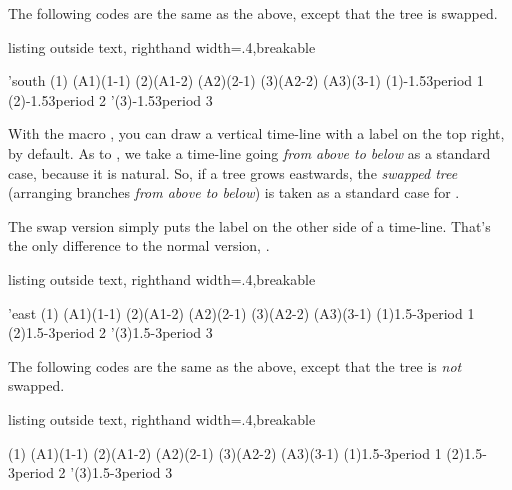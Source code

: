 The following codes are the same as the above, except that the tree is swapped.

\begin{tcblisting}{listing outside text, righthand width=.4\linewidth,breakable}
\begin{istgame}[font=\scriptsize]
\setistgrowdirection'{south} %
\xtdistance{10mm}{20mm}
\istrootcntm(1)       \istb \istbm \endist
\istroot(A1)(1-1)     \istb \istb  \endist
\istrootcntm(2)(A1-2) \istb \istbm \endist
\istroot(A2)(2-1)     \istb \istb  \endist
\istrootcntm(3)(A2-2) \istb \istbm \endist
\istroot(A3)(3-1)     \istb \istb  \endist
\xtTimeLineH[->](1){-1.5}{3}{period 1}
\xtTimeLineH(2){-1.5}{3}{period 2}
\xtTimeLineH'(3){-1.5}{3}{period 3}
\end{istgame}
\end{tcblisting}

With the macro \icmd{\xtTimeLineV}, you can draw a vertical time-line with a label on the top right, by default.
As to \cmd{\xtTimeLineV}, we take a time-line going \emph{from above to below} as a standard case, because it is natural.
So, if a tree grows eastwards, the \emph{swapped tree} (arranging branches \emph{from above to below}) is taken as a standard case for \cmd{\xtTimeLineV}.

The swap version  simply puts the label on the other side of a time-line.
That's the only difference to the normal version, \cmd{\xtTimeLineV}.

\begin{tcblisting}{listing outside text, righthand width=.4\linewidth,breakable}
\begin{istgame}[font=\scriptsize]
\setistgrowdirection'{east} %
\xtdistance{10mm}{20mm}
\istrootcntm(1)       \istb \istbm \endist
\istroot(A1)(1-1)     \istb \istb  \endist
\istrootcntm(2)(A1-2) \istb \istbm \endist
\istroot(A2)(2-1)     \istb \istb  \endist
\istrootcntm(3)(A2-2) \istb \istbm \endist
\istroot(A3)(3-1)     \istb \istb  \endist
\xtTimeLineV[->](1){1.5}{-3}{period 1}
\xtTimeLineV(2){1.5}{-3}{period 2}
\xtTimeLineV'(3){1.5}{-3}{period 3}
\end{istgame}
\end{tcblisting}

The following codes are the same as the above, except that the tree is \emph{not} swapped.
\begin{tcblisting}{listing outside text, righthand width=.4\linewidth,breakable}
\begin{istgame}[font=\scriptsize]
\xtdistance{10mm}{20mm}
\istrootcntm(1)       \istb \istbm \endist
\istroot(A1)(1-1)     \istb \istb  \endist
\istrootcntm(2)(A1-2) \istb \istbm \endist
\istroot(A2)(2-1)     \istb \istb  \endist
\istrootcntm(3)(A2-2) \istb \istbm \endist
\istroot(A3)(3-1)     \istb \istb  \endist
\xtTimeLineV[->](1){1.5}{-3}{period 1}
\xtTimeLineV(2){1.5}{-3}{period 2}
\xtTimeLineV'(3){1.5}{-3}{period 3}
\end{istgame}
\end{tcblisting}

